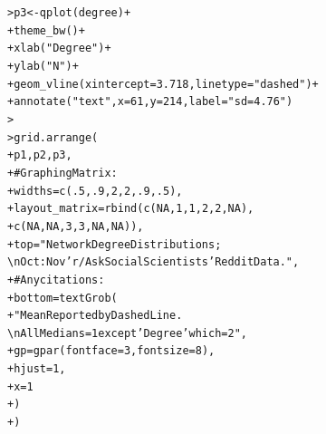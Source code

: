 \documentclass[12pt]{article}\usepackage[]{graphicx}\usepackage[]{color}
\makeatletter
\newcommand{\hlnum}[1]{\textcolor[rgb]{0.82,0.78,0.62}{#1}}%
\newcommand{\hlstr}[1]{\textcolor[rgb]{0.82,0.78,0.62}{#1}}%
\newcommand{\hlcom}[1]{\textcolor[rgb]{0.404,0.408,0.42}{#1}}%
\newcommand{\hlopt}[1]{\textcolor[rgb]{0.882,0.878,0.898}{#1}}%
\newcommand{\hlstd}[1]{\textcolor[rgb]{0.882,0.878,0.898}{#1}}%
\newcommand{\hlkwb}[1]{\textcolor[rgb]{0.902,0.675,0.196}{#1}}%
\newcommand{\hlkwc}[1]{\textcolor[rgb]{0.812,0.522,0.388}{#1}}%
\newcommand{\hlkwd}[1]{\textcolor[rgb]{0.733,0.388,0.812}{#1}}%
\newenvironment{kframe}{%
 \def\at@end@of@kframe{}%
 \ifinner\ifhmode%
  \def\at@end@of@kframe{\end{minipage}}%
  \begin{minipage}{\columnwidth}%
 \fi\fi%
 \def\FrameCommand##1{\hskip\@totalleftmargin \hskip-\fboxsep
 \colorbox{shadecolor}{##1}\hskip-\fboxsep
     \hskip-\linewidth \hskip-\@totalleftmargin \hskip\columnwidth}%
 \MakeFramed {\advance\hsize-\width
   \@totalleftmargin\z@ \linewidth\hsize
   \@setminipage}}%
 {\par\unskip\endMakeFramed%
 \at@end@of@kframe}
\newenvironment{knitrout}{}{} %
\makeatother
\begin{document}
\begin{flushleft}
\begin{center}
\begin{knitrout}
\begin{kframe}
{\ttfamily\noindent\bfseries\color{errorcolor}{\#\# Error in eval\_tidy(mapping\$x, data, caller\_env): object 'in.degree' not found}}\begin{alltt}
\hlstd{> }\hlstd{p3} \hlkwb{<-} \hlkwd{qplot}\hlstd{(degree)}\hlopt{+}
\hlstd{+ }     \hlkwd{theme_bw}\hlstd{()}\hlopt{+}
\hlstd{+ }     \hlkwd{xlab}\hlstd{(}\hlstr{"Degree"}\hlstd{)}\hlopt{+}
\hlstd{+ }     \hlkwd{ylab}\hlstd{(}\hlstr{"N"}\hlstd{)}\hlopt{+}
\hlstd{+ }     \hlkwd{geom_vline}\hlstd{(}\hlkwc{xintercept}\hlstd{=}\hlnum{3.718}\hlstd{,} \hlkwc{linetype}\hlstd{=}\hlstr{"dashed"}\hlstd{)}\hlopt{+}
\hlstd{+ }     \hlkwd{annotate}\hlstd{(}\hlstr{"text"}\hlstd{,} \hlkwc{x} \hlstd{=} \hlnum{61}\hlstd{,} \hlkwc{y} \hlstd{=} \hlnum{214}\hlstd{,} \hlkwc{label} \hlstd{=} \hlstr{"sd = 4.76"}\hlstd{)}
\hlstd{> }
\hlstd{> }\hlkwd{grid.arrange}\hlstd{(}
\hlstd{+ }     \hlstd{p1, p2, p3,}
\hlstd{+ }     \hlcom{# Graphing Matrix:}
\hlstd{+ }     \hlkwc{widths} \hlstd{=} \hlkwd{c}\hlstd{(}\hlnum{.5}\hlstd{,} \hlnum{.9} \hlstd{,}\hlnum{2}\hlstd{,} \hlnum{2}\hlstd{,} \hlnum{.9}\hlstd{,} \hlnum{.5}\hlstd{),}
\hlstd{+ }     \hlkwc{layout_matrix} \hlstd{=} \hlkwd{rbind}\hlstd{(}\hlkwd{c}\hlstd{(}\hlnum{NA}\hlstd{,} \hlnum{1}\hlstd{,} \hlnum{1}\hlstd{,} \hlnum{2}\hlstd{,} \hlnum{2}\hlstd{,} \hlnum{NA}\hlstd{),}
\hlstd{+ }                           \hlkwd{c}\hlstd{(}\hlnum{NA}\hlstd{,} \hlnum{NA}\hlstd{,} \hlnum{3}\hlstd{,} \hlnum{3}\hlstd{,} \hlnum{NA}\hlstd{,} \hlnum{NA}\hlstd{)),}
\hlstd{+ }     \hlkwc{top} \hlstd{=} \hlstr{"Network Degree Distributions;
          \textbackslash{}n Oct : Nov'r/AskSocialScientists' Reddit Data."}\hlstd{,}
\hlstd{+ }     \hlcom{# Any citations:}
\hlstd{+ }     \hlkwc{bottom} \hlstd{=} \hlkwd{textGrob}\hlstd{(}
\hlstd{+ }          \hlstr{"Mean Reported by Dashed Line.
          \textbackslash{}n All Medians = 1 except 'Degree' which = 2 "}\hlstd{,}
\hlstd{+ }          \hlkwc{gp} \hlstd{=} \hlkwd{gpar}\hlstd{(}\hlkwc{fontface} \hlstd{=} \hlnum{3}\hlstd{,} \hlkwc{fontsize} \hlstd{=} \hlnum{8}\hlstd{),}
\hlstd{+ }          \hlkwc{hjust} \hlstd{=} \hlnum{1}\hlstd{,}
\hlstd{+ }          \hlkwc{x} \hlstd{=} \hlnum{1}
\hlstd{+ }     \hlstd{)}
\hlstd{+ }\hlstd{)}
\end{alltt}


{\ttfamily\noindent\bfseries\color{errorcolor}{\#\# Error: Aesthetics must be valid data columns. Problematic aesthetic(s): x = degree. \\\#\# Did you mistype the name of a data column or forget to add after\_stat()?}}\end{kframe}
\end{knitrout}
\end{center}



\end{flushleft}
\end{document}
